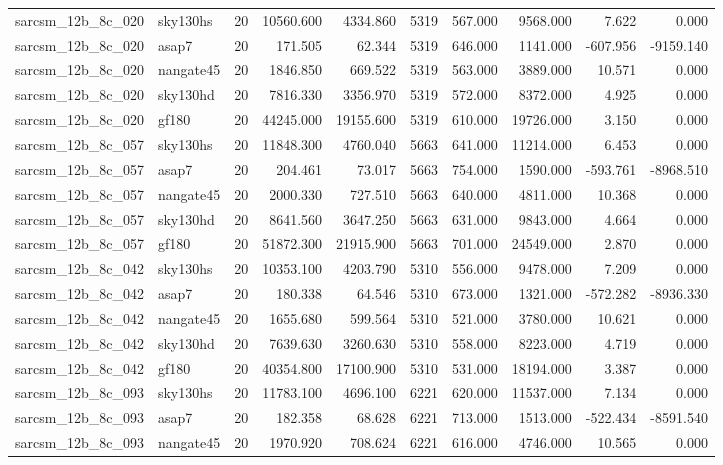 \documentclass{article}
\begin{document}
\begin{longtable}{llrrrrrrrr}
sarcsm\_12b\_8c\_020 & sky130hs & 20 & 10560.600 & 4334.860 & 5319 & 567.000 & 9568.000 & 7.622 & 0.000 \\
sarcsm\_12b\_8c\_020 & asap7 & 20 & 171.505 & 62.344 & 5319 & 646.000 & 1141.000 & -607.956 & -9159.140 \\
sarcsm\_12b\_8c\_020 & nangate45 & 20 & 1846.850 & 669.522 & 5319 & 563.000 & 3889.000 & 10.571 & 0.000 \\
sarcsm\_12b\_8c\_020 & sky130hd & 20 & 7816.330 & 3356.970 & 5319 & 572.000 & 8372.000 & 4.925 & 0.000 \\
sarcsm\_12b\_8c\_020 & gf180 & 20 & 44245.000 & 19155.600 & 5319 & 610.000 & 19726.000 & 3.150 & 0.000 \\
sarcsm\_12b\_8c\_057 & sky130hs & 20 & 11848.300 & 4760.040 & 5663 & 641.000 & 11214.000 & 6.453 & 0.000 \\
sarcsm\_12b\_8c\_057 & asap7 & 20 & 204.461 & 73.017 & 5663 & 754.000 & 1590.000 & -593.761 & -8968.510 \\
sarcsm\_12b\_8c\_057 & nangate45 & 20 & 2000.330 & 727.510 & 5663 & 640.000 & 4811.000 & 10.368 & 0.000 \\
sarcsm\_12b\_8c\_057 & sky130hd & 20 & 8641.560 & 3647.250 & 5663 & 631.000 & 9843.000 & 4.664 & 0.000 \\
sarcsm\_12b\_8c\_057 & gf180 & 20 & 51872.300 & 21915.900 & 5663 & 701.000 & 24549.000 & 2.870 & 0.000 \\
sarcsm\_12b\_8c\_042 & sky130hs & 20 & 10353.100 & 4203.790 & 5310 & 556.000 & 9478.000 & 7.209 & 0.000 \\
sarcsm\_12b\_8c\_042 & asap7 & 20 & 180.338 & 64.546 & 5310 & 673.000 & 1321.000 & -572.282 & -8936.330 \\
sarcsm\_12b\_8c\_042 & nangate45 & 20 & 1655.680 & 599.564 & 5310 & 521.000 & 3780.000 & 10.621 & 0.000 \\
sarcsm\_12b\_8c\_042 & sky130hd & 20 & 7639.630 & 3260.630 & 5310 & 558.000 & 8223.000 & 4.719 & 0.000 \\
sarcsm\_12b\_8c\_042 & gf180 & 20 & 40354.800 & 17100.900 & 5310 & 531.000 & 18194.000 & 3.387 & 0.000 \\
sarcsm\_12b\_8c\_093 & sky130hs & 20 & 11783.100 & 4696.100 & 6221 & 620.000 & 11537.000 & 7.134 & 0.000 \\
sarcsm\_12b\_8c\_093 & asap7 & 20 & 182.358 & 68.628 & 6221 & 713.000 & 1513.000 & -522.434 & -8591.540 \\
sarcsm\_12b\_8c\_093 & nangate45 & 20 & 1970.920 & 708.624 & 6221 & 616.000 & 4746.000 & 10.565 & 0.000 \\

\end{longtable}
\end{document}
